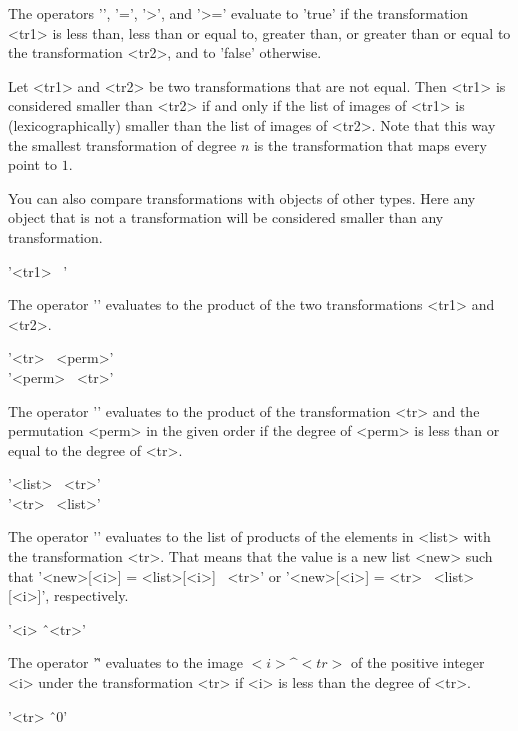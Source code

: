 The  operators  '\<', '\<=',   '>', and '>='  evaluate   to 'true' if the
transformation <tr1> is less  than, less than  or equal to, greater than,
or  greater  than or equal  to  the transformation <tr2>, and  to 'false'
otherwise.

Let  <tr1>  and <tr2> be  two transformations  that  are not equal.  Then
<tr1> is considered smaller than <tr2> if and  only if the list of images
of <tr1> is (lexicographically) smaller than the list of images of <tr2>.
Note that this  way the  smallest  transformation of  degree  $n$ is  the
transformation that maps every point to $1$.

You can also compare transformations  with objects of  other types.  Here
any object that is  not a transformation  will be considered smaller than
any transformation.

 
'<tr1> \*\ <tr2>'%

The operator '\*'  evaluates to  the product  of the two  transformations
<tr1> and <tr2>.

\vspace{5mm}
'<tr> \*\ <perm>'\\
'<perm> \*\ <tr>'%

The operator '\*' evaluates to the product of the transformation <tr> and
the permutation <perm> in the given order if the degree of <perm> is less
than or equal to the degree of <tr>.

\vspace{5mm}
'<list> \*\ <tr>' \\
'<tr> \*\ <list>'%

The operator '\*'  evaluates to the list of  products of the  elements in
<list> with the transformation <tr>.  That means that  the value is a new
list <new> such that '<new>[<i>] = <list>[<i>] \*\ <tr>' or '<new>[<i>] =
<tr> \*\ <list>[<i>]', respectively.

\vspace{5mm}
'<i> \^\ <tr>'%

The operator '\^'  evaluates  to the image  $<i>\^<tr>$ of  the  positive
integer <i> under the transformation <tr> if <i> is  less than the degree
of <tr>.

\vspace{5mm}
'<tr> \^\ 0'

